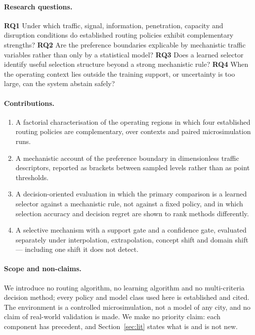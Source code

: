 \paragraph{Research questions.}
\textbf{RQ1} Under which traffic, signal, information, penetration, capacity and
disruption conditions do established routing policies exhibit complementary
strengths?
\textbf{RQ2} Are the preference boundaries explicable by mechanistic traffic
variables rather than only by a statistical model?
\textbf{RQ3} Does a learned selector identify useful selection structure beyond
a strong mechanistic rule?
\textbf{RQ4} When the operating context lies outside the training support, or
uncertainty is too large, can the system abstain safely?

\paragraph{Contributions.}
\begin{enumerate}
\item A factorial characterisation of the operating regions in which four
established routing policies are complementary, over \NumContexts{} contexts
and \NumRunsMain{} paired microsimulation runs.
\item A mechanistic account of the preference boundary in dimensionless traffic
descriptors, reported as brackets between sampled levels rather than as point
thresholds.
\item A decision-oriented evaluation in which the primary comparison is a
learned selector against a mechanistic rule, not against a fixed policy, and in
which selection accuracy and decision regret are shown to rank methods
differently.
\item A selective mechanism with a support gate and a confidence gate,
evaluated separately under interpolation, extrapolation, concept shift and
domain shift --- including one shift it does not detect.
\end{enumerate}

\paragraph{Scope and non-claims.}
We introduce no routing algorithm, no learning algorithm and no multi-criteria
decision method; every policy and model class used here is established and
cited. The environment is a controlled microsimulation, not a model of any
city, and no claim of real-world validation is made. We make no priority claim:
each component has precedent, and Section~\ref{sec:lit} states what is and is
not new.

